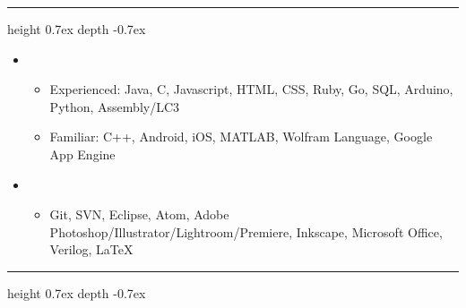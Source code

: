 \documentclass[10pt,letterpaper]{article}
\def\Vhrulefill{\leavevmode\leaders\hrule height 0.7ex depth \dimexpr0.4pt-0.7ex\hfill\kern0pt}
\begin{document}
%
%


\vspace{-.78mm}
\noindent \large{}  \Vhrulefill
\vspace{-.7mm}


\begin{itemize}[label={}]

 \item \small{}
 \vspace{-1.58mm}
 \begin{itemize}[label={}]
 	\item \small{Experienced: \hspace{3mm} Java, C, Javascript, HTML, CSS, Ruby, Go, SQL, Arduino, Python, Assembly/LC3}
 	\item \small{Familiar: \hspace{8mm} C++, Android, iOS, MATLAB, Wolfram Language, Google App Engine}
 \end{itemize}

  \item \small{}
 \vspace{-1.58mm}
 \begin{itemize}[label={}]
 	\item \small{Git, SVN, Eclipse, Atom, Adobe Photoshop/Illustrator/Lightroom/Premiere, Inkscape, Microsoft Office, Verilog, {\selectfont \LaTeX}}
 \end{itemize}
\end{itemize}



%
%


\vspace{-.78mm}
\noindent \large{}  \Vhrulefill
\vspace{-.7mm}
\end{document}
